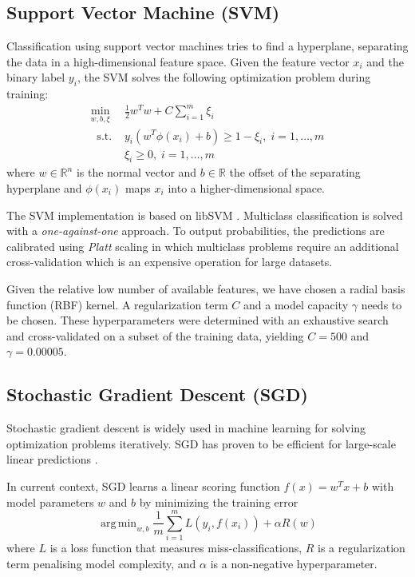 \documentclass[journal]{IEEEtran}
\DeclareMathOperator*{\argmin}{arg\,min}
\begin{document}
\subsection{Support Vector Machine (SVM)}
Classification using support vector machines tries to find a hyperplane, separating the data in a high-dimensional feature space. Given the feature vector $x_i$ and the binary label $y_i$, the SVM solves the following optimization problem during training:
\begin{equation}
\begin{split}
\min_{w, b, \xi} \ & \frac{1}{2}w^Tw + C\sum_{i=1}^m \xi_i \\
\ \text{ s.t. } & y_i(w^T\phi(x_i)+b) \geq 1-\xi_i, \; i = 1, \ldots, m \\
& \xi_i \geq 0, \; i = 1, \ldots, m
\end{split}
\end{equation}
where $w\in \mathbb{R}^n $ is the normal vector and $b \in \mathbb{R}$ the offset of the separating hyperplane and $\phi(x_i)$ maps $x_i$ into a higher-dimensional space.

The SVM implementation is based on libSVM \cite{chang2011libsvm}. Multiclass classification is solved with a \textit{one-against-one} approach. To output probabilities, the predictions are calibrated using \textit{Platt} scaling in which multiclass problems require an additional cross-validation which is an expensive operation for large datasets.

Given the relative low number of available features, we have chosen a radial basis function (RBF) kernel. A regularization term $C$ and a model capacity $\gamma$ needs to be chosen. These hyperparameters were determined with an exhaustive search and cross-validated on a subset of the training data, yielding $C=500$ and $\gamma=0.00005$.

\subsection{Stochastic Gradient Descent (SGD)}
Stochastic gradient descent is widely used in machine learning for solving optimization problems iteratively. SGD has proven to be efficient for large-scale linear predictions \cite{zhang2004solving}.

In current context, SGD learns a linear scoring function $f(x) = w^Tx + b$ with model parameters $w$ and $b$ by minimizing the training error
\begin{equation}
\argmin_{w,b} \frac{1}{m}\sum_{i=1}^mL(y_i, f(x_i)) + \alpha R(w)
\end{equation}
where $L$ is a loss function that measures miss-classifications, $R$ is a regularization term penalising model complexity, and $\alpha$ is a non-negative hyperparameter.
\end{document}
